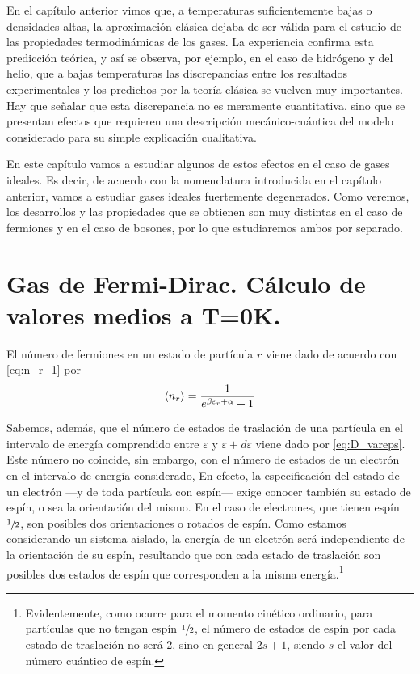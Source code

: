En el capítulo anterior vimos que, a temperaturas suficientemente bajas o densidades altas, la aproximación clásica dejaba de ser válida para el estudio de las propiedades termodinámicas de los gases.
La experiencia confirma esta predicción teórica, y así se observa, por ejemplo, en el caso de hidrógeno y del helio, que a bajas temperaturas las discrepancias entre los resultados experimentales y los predichos por la teoría clásica se vuelven muy importantes.
Hay que señalar que esta discrepancia no es meramente cuantitativa, sino que se presentan efectos que requieren una descripción mecánico-cuántica del modelo considerado para su simple explicación cualitativa.

En este capítulo vamos a estudiar algunos de estos efectos en el caso de gases ideales.
Es decir, de acuerdo con la nomenclatura introducida en el capítulo anterior, vamos a estudiar gases ideales fuertemente degenerados. Como veremos, los desarrollos y las propiedades que se obtienen son muy distintas en el caso de fermiones y en el caso de bosones, por lo que estudiaremos ambos por separado.

\newpage
\section{Gas de Fermi-Dirac. Cálculo de valores medios a T=0K.}

El número de fermiones en un estado de partícula $r$ viene dado de acuerdo con \eqref{eq:n_r_1} por
\begin{equation}\label{eq:n_r_t8}
	\expval{n_r} = \frac{1}{e^{\beta\varepsilon_r + \alpha} + 1}
\end{equation}

Sabemos, además, que el número de estados de traslación de una partícula en el intervalo de energía comprendido entre $\varepsilon$ y $\varepsilon+d\varepsilon$ viene dado por \eqref{eq:D_vareps}.
Este número no coincide, sin embargo, con el número de estados de un electrón en el intervalo de energía considerado, En efecto, la especificación del estado de un electrón ---y de toda partícula con espín--- exige conocer también su estado de espín, o sea la orientación del mismo.
En el caso de electrones, que tienen espín $\sfrac{1}{2}$, son posibles dos orientaciones o rotados de espín.
Como estamos considerando un sistema aislado, la energía de un electrón será independiente de la orientación de su espín, resultando que con cada estado de traslación son posibles dos estados de espín que corresponden a la misma energía.\footnote{Evidentemente, como ocurre para el momento cinético ordinario, para partículas que no tengan espín $\sfrac{1}{2}$, el número de estados de espín por cada estado de traslación no será 2, sino en general $2s + 1$, siendo $s$ el valor del número cuántico de espín.}

